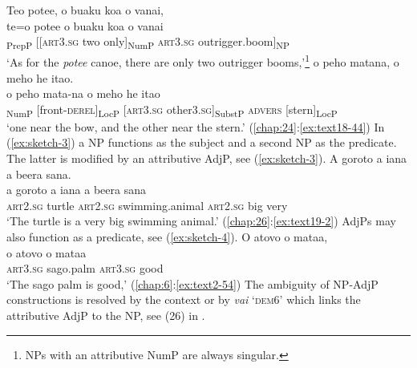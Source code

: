 \documentclass[output=paper]{langscibook}
\begin{document}
\ea \label{ex:sketch-2}
    \ea \label{ex:sketch-2a}
    Teo potee, o buaku koa o vanai,\\
    \gll te=o	potee	o	buaku	koa	o   vanai\\
    [\textsc{prep}=\textsc{art}3.\textsc{sg}	potee]\textsubscript{PrepP}	[[\textsc{art}3.\textsc{sg}	two	only]\textsubscript{NumP}	\textsc{art}3.\textsc{sg}	outrigger.boom]\textsubscript{NP}\\
    \glt `As for the \textit{potee} canoe, there are only two outrigger booms,'\footnote{NPs with an attributive NumP are always singular.}
    \ex \label{ex:sketch-2b}
    o peho matana, o meho he itao.\\
    \gll 	o	peho	mata-na	o	meho	he	itao\\
    [\textsc{art}3.\textsc{sg}	one3.\textsc{sg}]\textsubscript{NumP}	[front-\textsc{derel}]\textsubscript{LocP}	[\textsc{art}3.\textsc{sg}	other3.\textsc{sg}]\textsubscript{SubstP}	\textsc{advers}	[stern]\textsubscript{LocP}\\
    \glt `one near the bow, and the other near the stern.' (\ref{chap:24}:\ref{ex:text18-44})
    \z    
\z 
In (\ref{ex:sketch-3}) a NP functions as the subject and a second NP as the predicate. The latter is modified by an attributive AdjP, see (\ref{ex:sketch-3}).
\ea\label{ex:sketch-3}
    A goroto a iana a beera sana.\\
    \gll a	goroto	a	iana	a	beera	sana\\
    \textsc{art}2.\textsc{sg}	turtle	\textsc{art}2.\textsc{sg}	swimming.animal	\textsc{art}2.\textsc{sg}	big	very\\
    \glt `The turtle is a very big swimming animal.' (\ref{chap:26}:\ref{ex:text19-2})
\z
AdjPs may also function as a predicate, see (\ref{ex:sketch-4}).
\ea\label{ex:sketch-4}
    O atovo o mataa,\\
    \gll o	atovo	o	mataa\\
    \textsc{art}3.\textsc{sg}	sago.palm	\textsc{art}3.\textsc{sg}	good\\
    \glt `The sago palm is good,' (\ref{chap:6}:\ref{ex:text2-54})
\z
The ambiguity of NP-AdjP constructions is resolved by the context or by \textit{vai} `\textsc{dem}6' which links the attributive AdjP to the NP, see (26) in .
\end{document}
